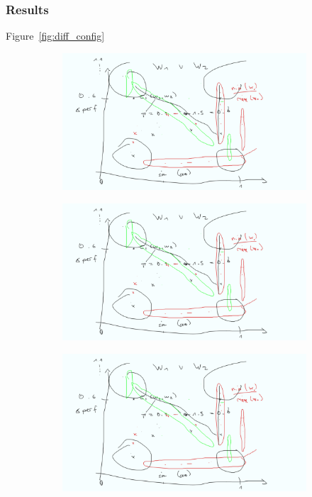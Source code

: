 \subsubsection{Results} {\color{red} Figure~\ref{fig:diff_config}}
\begin{figure}
	\centering
	\begin{subfigure}{0.33\textwidth}
		\centering
		\includegraphics[width=\linewidth]{images/mockup.png}
		\caption{\batik}
	\end{subfigure}
	\begin{subfigure}{0.33\textwidth}
		\centering
		\includegraphics[width=\linewidth]{images/mockup.png}
		\caption{\dconvert}
	\end{subfigure}
	\begin{subfigure}{0.33\textwidth}
		\centering
		\includegraphics[width=\linewidth]{images/mockup.png}

\end{subfigure}
\end{figure}
